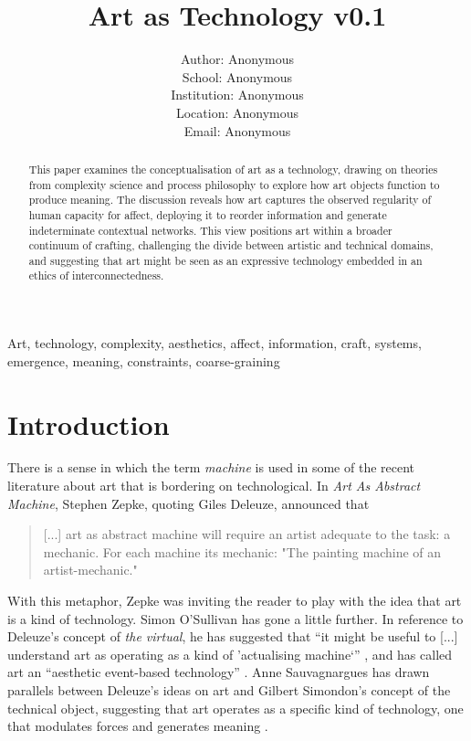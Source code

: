 \documentclass[letterpaper]{article}
\title{Art as Technology v0.1}
\author{Author: Anonymous\\
School: Anonymous\\
Institution: Anonymous\\
Location: Anonymous\\
Email: Anonymous\\
\newline
\newline
}
\begin{document}
 
\maketitle
\begin{abstract}

This paper examines the conceptualisation of art as a technology, drawing on theories from complexity science and process philosophy to explore how art objects function to produce meaning. The discussion reveals how art captures the observed regularity of human capacity for affect, deploying it to reorder information and generate indeterminate contextual networks. This view positions art within a broader continuum of crafting, challenging the divide between artistic and technical domains, and suggesting that art might be seen as an expressive technology embedded in an ethics of interconnectedness.
\end{abstract}


Art, technology, complexity, aesthetics, affect, information, craft, systems, emergence, meaning, constraints, coarse-graining

\section{Introduction}

    There is a sense in which the term \emph{machine} is used in some of the recent literature about art that is bordering on technological. In \emph{Art As Abstract Machine}, Stephen Zepke, quoting Giles Deleuze, announced that 

    \begin{quote}
        [...] art as abstract machine will require an artist adequate to the task: a mechanic. For each machine its mechanic: "The painting machine of an artist-mechanic." \citep[p.1]{ZepkeArtAsAbstrctMchn2005}
    \end{quote}

    With this metaphor, Zepke was inviting the reader to play with the idea that art is a kind of technology. Simon O'Sullivan has gone a little further. In reference to Deleuze's concept of \emph{the virtual}, he has suggested that “it might be useful to [...] understand art as operating as a kind of ’actualising machine‘” \citep[p.200]{ZepkeOSullivanDlzCntmprryArt2010}, and has called art an “aesthetic event-based technology” \citep[p.202]{ZepkeOSullivanDlzCntmprryArt2010}. Anne Sauvagnargues has drawn parallels between Deleuze’s ideas on art and Gilbert Simondon’s concept of the technical object, suggesting that art operates as a specific kind of technology, one that modulates forces and generates meaning \citep[pp.74-75]{SauvagnarguesArtmchns2016}.
\end{document}
